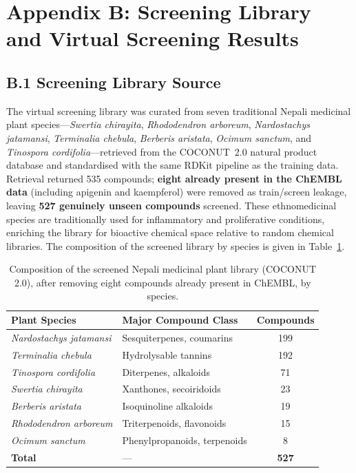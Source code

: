 \section*{Appendix B: Screening Library and Virtual
          Screening Results}
\label{app:library}

\subsection*{B.1 Screening Library Source}

The virtual screening library was curated from seven traditional Nepali medicinal
plant species---\textit{Swertia chirayita}, \textit{Rhododendron
arboreum}, \textit{Nardostachys jatamansi}, \textit{Terminalia
chebula}, \textit{Berberis aristata}, \textit{Ocimum sanctum},
and \textit{Tinospora cordifolia}---retrieved from the
COCONUT~2.0 natural product database \parencite{sorokina2021coconut}
and standardised with the same RDKit pipeline as the training data.
Retrieval returned 535 compounds; \textbf{eight already present in the ChEMBL data}
(including apigenin and kaempferol) were removed as train/screen leakage, leaving
\textbf{527 genuinely unseen compounds} screened. These ethnomedicinal species are
traditionally used for inflammatory and proliferative conditions, enriching the
library for bioactive chemical space relative to random chemical libraries. The
composition of the screened library by species is given in
Table~\ref{tab:app_nepali_lib}.

\begin{table}[H]
\caption{Composition of the screened Nepali medicinal plant library (COCONUT 2.0),
         after removing eight compounds already present in ChEMBL, by species.}
\label{tab:app_nepali_lib}
\centering
\begin{tabular}{@{}llc@{}}
\toprule
\textbf{Plant Species} & \textbf{Major Compound Class}
                       & \textbf{Compounds} \\
\midrule
\textit{Nardostachys jatamansi} & Sesquiterpenes, coumarins    & 199 \\
\textit{Terminalia chebula}     & Hydrolysable tannins         & 192 \\
\textit{Tinospora cordifolia}   & Diterpenes, alkaloids        & 71  \\
\textit{Swertia chirayita}      & Xanthones, secoiridoids      & 23  \\
\textit{Berberis aristata}      & Isoquinoline alkaloids       & 19  \\
\textit{Rhododendron arboreum}  & Triterpenoids, flavonoids    & 15  \\
\textit{Ocimum sanctum}         & Phenylpropanoids, terpenoids & 8   \\
\midrule
\textbf{Total} & --- & \textbf{527} \\
\bottomrule
\end{tabular}
\end{table}

